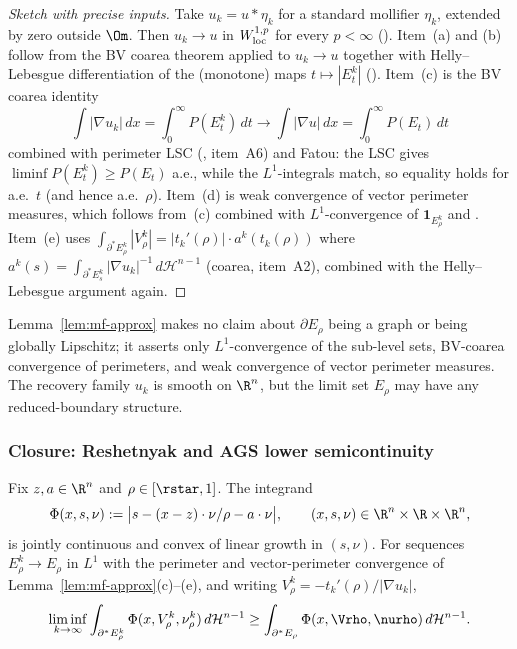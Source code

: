 \begin{proof}[Sketch with precise inputs]
Take $u_k=u*\eta_k$ for a standard mollifier $\eta_k$, extended by zero
outside $\Om$. Then $u_k\to u$ in $W^{1,p}_{\rm loc}$ for every
$p<\infty$ (\cite[Thm.~3.40]{AFP2000}). Item~(a) and (b) follow from the BV
coarea theorem applied to $u_k\to u$ together with Helly--Lebesgue
differentiation of the (monotone) maps $t\mapsto|E^k_t|$
(\cite[Thm.~13.1, Lem.~13.2]{Maggi2012}). Item~(c) is the BV coarea identity
\[
   \int|\nabla u_k|\,dx=\int_0^\infty P(E^k_t)\,dt\to\int|\nabla u|\,dx
      =\int_0^\infty P(E_t)\,dt
\]
combined with perimeter LSC (\cite[Prop.~12.15]{Maggi2012}, item~A6) and
Fatou: the LSC gives $\liminf P(E^k_t)\ge P(E_t)$ a.e., while the
$L^1$-integrals match, so equality holds for a.e.~$t$ (and hence a.e.~$\rho$).
Item~(d) is weak convergence of vector perimeter measures, which follows
from~(c) combined with $L^1$-convergence of $\mathbf 1_{E^k_\rho}$ and
\cite[Cor.~12.21]{Maggi2012}. Item~(e) uses
$\int_{\partial^*E^k_\rho}|V^k_\rho|=|t_k'(\rho)|\cdot a^k(t_k(\rho))$ where
$a^k(s)=\int_{\partial^*E^k_s}|\nabla u_k|^{-1}\,d\mathcal H^{n-1}$
(coarea, item~A2), combined with the Helly--Lebesgue argument again.
\end{proof}

\begin{remark}\label{rem:no-graph}
Lemma~\ref{lem:mf-approx} makes no claim about $\partial E_\rho$ being a
graph or being globally Lipschitz; it asserts only $L^1$-convergence of the
sub-level sets, BV-coarea convergence of perimeters, and weak convergence of
vector perimeter measures. The recovery family $u_k$ is smooth on $\R^n$,
but the limit set $E_\rho$ may have any reduced-boundary structure.
\end{remark}

\subsubsection{Closure: Reshetnyak and AGS lower semicontinuity}
\label{sec:metric-T-pass}

\begin{lemma}\label{lem:mf-reshetnyak}
Fix $z,a\in\R^n$ and $\rho\in[\rstar,1]$. The integrand
\[
   \Phi(x,s,\nu):=\bigl|s-(x-z)\cdot\nu/\rho-a\cdot\nu\bigr|,
   \qquad (x,s,\nu)\in\R^n\times\R\times\R^n,
\]
is jointly continuous and convex of linear growth in $(s,\nu)$. For sequences
$E^k_\rho\to E_\rho$ in $L^1$ with the perimeter and vector-perimeter
convergence of Lemma~\ref{lem:mf-approx}(c)--(e), and writing
$V^k_\rho=-t_k'(\rho)/|\nabla u_k|$,
\begin{equation}\label{eq:mf-reshetnyak}
   \liminf_{k\to\infty}\int_{\partial^*E^k_\rho}
      \Phi(x,V^k_\rho,\nu^k_\rho)\,d\mathcal H^{n-1}
   \ge\int_{\partial^*E_\rho}\Phi(x,\Vrho,\nurho)\,d\mathcal H^{n-1}.
\end{equation}
\end{lemma}

